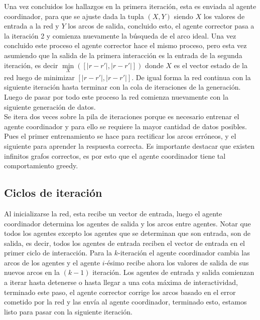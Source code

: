         Una vez concluidos los hallazgos en la primera iteración, esta es enviada al agente coordinador, para que se ajuste dada la tupla $(X,Y)$ siendo
        $X$ los valores de entrada a la red y $Y$ los arcos de salida, concluido esto, el agente corrector pasa a la iteración 2 y comienza nuevamente la búsqueda de el arco ideal. Una vez concluido este proceso
        el agente corrector hace el mismo proceso, pero esta vez asumiendo que la salida de la primera interacción es la entrada de la segunda iteración, es decir $\underset{X}{\min}([|r-r'|,|r-r'|])$ donde $X$ es el vector estado de la red luego de minimizar $[|r-r'|,|r-r'|]$.
        De igual forma la red continua con la siguiente iteración hasta terminar con la cola de iteraciones de la generación. Luego de pasar por todo este proceso la red comienza nuevamente con la siguiente generación de datos. \\

        Se itera dos veces sobre la pila de iteraciones porque es necesario entrenar el agente coordinador y para ello se requiere la mayor cantidad de datos posibles. Pues el primer entrenamiento se hace para rectificar los arcos erróneos, y el siguiente para aprender la respuesta correcta.
        Es importante destacar que existen infinitos grafos correctos, es por esto que el agente coordinador tiene tal comportamiento greedy.

        \subsection*{Ciclos de iteración}

         Al inicializarse la red, esta recibe un vector de entrada, luego el agente coordinador determina los agentes de salida y los arcos entre agentes. Notar que todos los agentes excepto los agentes que se determinan que son entrada, son de salida, es decir, todos los agentes de entrada reciben el vector de entrada en el primer ciclo de interacción. Para la $k$-iteración el agente coordinador cambia las arcos de los agentes y el agente $i$-ésimo recibe ahora los valores de salida de sus nuevos arcos en la $(k-1)$ iteración. Los agentes de entrada y salida comienzan a iterar hasta detenerse o hasta llegar a una cota máxima de interactividad, terminado este paso, el agente corrector corrige los arcos basado en el error cometido por la red y las envía al agente coordinador, terminado esto, estamos listo para pasar con la siguiente iteración. \\

